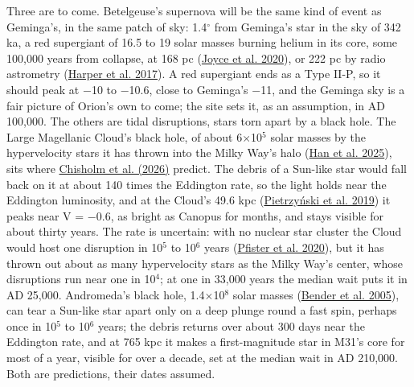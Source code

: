 \documentclass[9pt,twocolumn]{extarticle}
\begin{document}
Three are to come. Betelgeuse's supernova will be the same kind of event as Geminga's, in the same patch of sky: 1.4$^\circ$ from Geminga's star in the sky of 342 ka, a red supergiant of 16.5 to 19 solar masses burning helium in its core, some 100,000 years from collapse, at 168 pc (\protect\hyperlink{cite.joyce2020}{Joyce et al. 2020}), or 222 pc by radio astrometry (\protect\hyperlink{cite.harper2017}{Harper et al. 2017}). A red supergiant ends as a Type II-P, so it should peak at $-$10 to $-$10.6, close to Geminga's $-$11, and the Geminga sky is a fair picture of Orion's own to come; the site sets it, as an assumption, in AD 100,000. The others are tidal disruptions, stars torn apart by a black hole. The Large Magellanic Cloud's black hole, of about 6$\times$10$^{5}$ solar masses by the hypervelocity stars it has thrown into the Milky Way's halo (\protect\hyperlink{cite.han2025}{Han et al. 2025}), sits where \protect\hyperlink{cite.chisholm2026}{Chisholm et al. (2026)} predict. The debris of a Sun-like star would fall back on it at about 140 times the Eddington rate, so the light holds near the Eddington luminosity, and at the Cloud's 49.6 kpc (\protect\hyperlink{cite.pietrzynski2019}{Pietrzyński et al. 2019}) it peaks near V = $-$0.6, as bright as Canopus for months, and stays visible for about thirty years. The rate is uncertain: with no nuclear star cluster the Cloud would host one disruption in 10$^{5}$ to 10$^{6}$ years (\protect\hyperlink{cite.pfister2020}{Pfister et al. 2020}), but it has thrown out about as many hypervelocity stars as the Milky Way's center, whose disruptions run near one in 10$^{4}$; at one in 33,000 years the median wait puts it in AD 25,000. Andromeda's black hole, 1.4$\times$10$^{8}$ solar masses (\protect\hyperlink{cite.bender2005}{Bender et al. 2005}), can tear a Sun-like star apart only on a deep plunge round a fast spin, perhaps once in 10$^{5}$ to 10$^{6}$ years; the debris returns over about 300 days near the Eddington rate, and at 765 kpc it makes a first-magnitude star in M31's core for most of a year, visible for over a decade, set at the median wait in AD 210,000. Both are predictions, their dates assumed.
\end{document}
